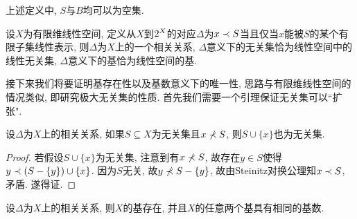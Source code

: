 \begin{remark}
  上述定义中, $S$与$B$均可以为空集.
\end{remark}

\begin{example}
  设$X$为有限维线性空间, 定义从$X$到$2^{X}$的对应$\Delta$为$x\prec S$当且仅当$x$能被$S$的某个有限子集线性表示, 则$\Delta$为$X$上的一个相关关系, $\Delta$意义下的无关集恰为线性空间中的线性无关集, $\Delta$意义下的基恰为线性空间的基.
\end{example}

接下来我们将要证明基存在性以及基数意义下的唯一性, 思路与有限维线性空间的情况类似, 即研究极大无关集的性质. 首先我们需要一个引理保证无关集可以``扩张".

\begin{proposition}\label{prop:dependlemma}
  设$\Delta$为$X$上的相关关系, 如果$S\subseteq X$为无关集且$x\nprec S$, 则$S\cup\{x\}$也为无关集.
\end{proposition}

\begin{proof}
  若假设$S\cup\{x\}$为无关集, 注意到有$x\nprec S$, 故存在$y\in S$使得$y\prec (S-\{y\})\cup \{x\}$. 因为$S$无关, 故$y\nprec S-\{y\}$, 故由Steinitz对换公理知$x\prec S$, 矛盾. 遂得证.
\end{proof}

\begin{theorem}\label{thm:dependbase}
  设$\Delta$为$X$上的相关关系, 则$X$的基存在, 并且$X$的任意两个基具有相同的基数.
\end{theorem}

